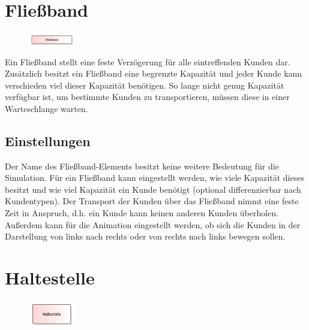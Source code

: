 \section{Fließband}
\label{ref:ModelElementConveyor}

\begin{figure}
\vspace{-22pt}
\includegraphics[width=2cm]{imageModelElementConveyor.png}
\vspace{-22pt}
\end{figure}

Ein Fließband stellt eine feste Verzögerung für alle eintreffenden Kunden dar.
Zusätzlich besitzt ein Fließband eine begrenzte Kapazität und jeder Kunde
kann verschieden viel dieser Kapazität benötigen. So lange nicht genug
Kapazität verfügbar ist, um bestimmte Kunden zu transportieren, müssen diese
in einer Warteschlange warten.

\subsection*{Einstellungen}

Der Name des Fließband-Elements besitzt keine weitere Bedeutung
für die Simulation. Für ein Fließband kann eingestellt werden,
wie viele Kapazität dieses besitzt und wie viel Kapazität ein
Kunde benötigt (optional differenzierbar nach Kundentypen). Der
Transport der Kunden über das Fließband nimmt eine feste Zeit in
Anspruch, d.h. ein Kunde kann keinen anderen Kunden überholen.
Außerdem kann für die Animation eingestellt werden, ob sich die
Kunden in der Darstellung von links nach rechts oder von rechts
nach links bewegen sollen.


\section{Haltestelle}
\label{ref:ModelElementTransportTransporterSource}

\begin{figure}
\vspace{-22pt}
\includegraphics[width=2cm]{imageModelElementTransportTransporterSource.png}
\vspace{-22pt}
\end{figure}

